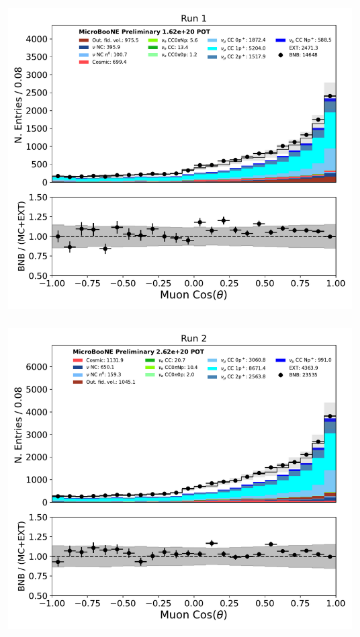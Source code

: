 \begin{figure}[hbt!] 
\begin{center}
    \begin{subfigure}[b]{0.35\textwidth}
        \centering
        \includegraphics[width=1.00\textwidth]{NuMuCCsel/Images/Ryan/Run1/trk_cos_theta_v_08052020_full_samples_longest_noCRT_event_category.pdf}
    \end{subfigure}
    \begin{subfigure}[b]{0.35\textwidth}
        \centering
        \includegraphics[width=1.00\textwidth]{NuMuCCsel/Images/Ryan/Run2/trk_cos_theta_v_08052020_full_samples_longest_noCRT_event_category.pdf}

\end{subfigure}
\end{center}
\end{figure}
